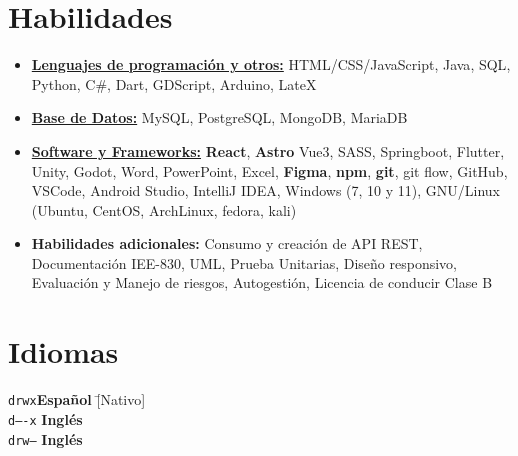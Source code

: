 \documentclass[11pt,a4paper,sans]{moderncv}
\newcommand{\sectionMargin}{-3mm}
\begin{document}
\vspace*{\sectionMargin}
\section{Habilidades}{
    \begin{itemize}[label=\textbullet, noitemsep]
        \item {\underline{\textbf{Lenguajes de programación y otros:}}
            {HTML/CSS/JavaScript},
            {Java},
            {SQL},
            {Python},
            {C\#},
            {Dart},
            {GDScript},
            {Arduino},
            {LateX}
        }
        \item {\underline{\textbf{Base de Datos:}}
            {MySQL},
            {PostgreSQL},
            {MongoDB},
            {MariaDB}
        }
        \item {\underline{\textbf{Software y Frameworks:}}
            \textbf{React},
            \textbf{Astro}
            {Vue3},
            {SASS},
            {Springboot},
            {Flutter},
            {Unity},
            {Godot},
            {Word},
            {PowerPoint},
            {Excel}, 
            \textbf{Figma},
            \textbf{npm},
            \textbf{git},
            {git flow},
            {GitHub},
            {VSCode},
            {Android Studio},
            {IntelliJ IDEA},
            {Windows} (7, 10 y 11),
            {GNU/Linux} (Ubuntu, CentOS, ArchLinux, fedora, kali)
        }
        \item {\textbf{Habilidades adicionales:} 
            Consumo y creación de {API REST},
            {Documentación IEE-830},
            {UML},
            {Prueba Unitarias},
            {Diseño responsivo},
            Evaluación y {Manejo de riesgos},  
            {Autogestión}, 
            Licencia de conducir {Clase B}
        }
    \end{itemize}
}

\vspace*{\sectionMargin}

\section{Idiomas}{
\begin{tabbing}
    \texttt{drwx}\hspace{1mm}\= \textbf{Español}    \hspace{1mm}\=  [Nativo] \\
    \texttt{d----x} \>          \textbf{Inglés}     \>              [B1] \\
    \texttt{drw--}  \>          \textbf{Inglés}     \>              [Técnico]
\end{tabbing}

}
\end{document}
